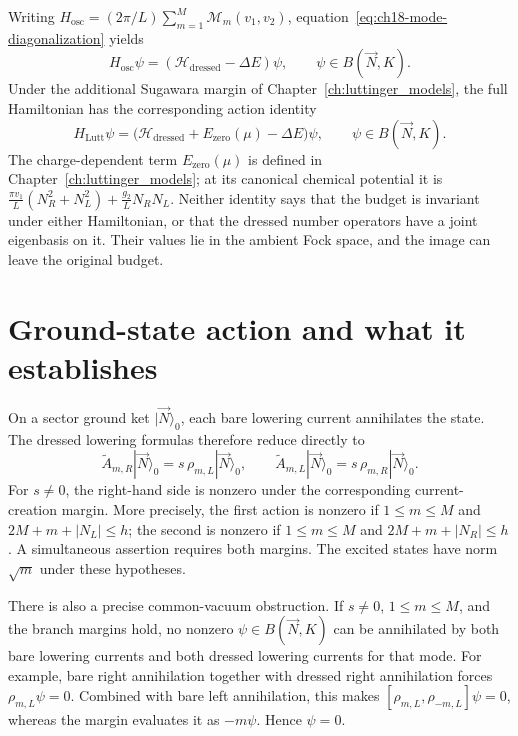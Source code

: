 Writing $H_{\mathrm{osc}}=(2\pi/L)\sum_{m=1}^M\mathcal M_m(v_1,v_2)$, equation~\eqref{eq:ch18-mode-diagonalization} yields
\begin{equation}
  H_{\mathrm{osc}}\psi=(\mathcal H_{\mathrm{dressed}}-\Delta E)\psi,
  \qquad \psi\in B(\vec N,K).
  \label{eq:ch18-oscillator-identity}
\end{equation}
\label{thm:oscillator_dressed_budget}
Under the additional Sugawara margin of Chapter~\ref{ch:luttinger_models}, the full Hamiltonian has the corresponding action identity
\begin{equation}
  H_{\mathrm{Lutt}}\psi=
  \bigl(\mathcal H_{\mathrm{dressed}}+E_{\mathrm{zero}}(\mu)-\Delta E\bigr)\psi,
  \qquad \psi\in B(\vec N,K).
  \label{eq:ch18-full-hamiltonian-identity}
\end{equation}
\label{thm:luttinger_hamiltonian_dressed_budget}
The charge-dependent term $E_{\mathrm{zero}}(\mu)$ is defined in Chapter~\ref{ch:luttinger_models}; at its canonical chemical potential it is $\frac{\pi v_1}{L}(N_R^2+N_L^2)+\frac{g_2}{L}N_RN_L$. Neither identity says that the budget is invariant under either Hamiltonian, or that the dressed number operators have a joint eigenbasis on it. Their values lie in the ambient Fock space, and the image can leave the original budget.

\section{Ground-state action and what it establishes}

On a sector ground ket $|\vec N\rangle_0$, each bare lowering current annihilates the state. The dressed lowering formulas therefore reduce directly to
\begin{equation}
  \widetilde A_{m,R}|\vec N\rangle_0
    =s\,\rho_{m,L}|\vec N\rangle_0,
  \qquad
  \widetilde A_{m,L}|\vec N\rangle_0
    =s\,\rho_{m,R}|\vec N\rangle_0.
  \label{eq:ch18-ground-action}
\end{equation}
\label{thm:ground_action}
For $s\ne0$, the right-hand side is nonzero under the corresponding current-creation margin. More precisely, the first action is nonzero if $1\leq m\leq M$ and $2M+m+|N_L|\leq h$; the second is nonzero if $1\leq m\leq M$ and $2M+m+|N_R|\leq h$. A simultaneous assertion requires both margins. The excited states have norm $\sqrt m$ under these hypotheses.

\label{thm:no_common_vacuum}
There is also a precise common-vacuum obstruction. If $s\ne0$, $1\leq m\leq M$, and the branch margins hold, no nonzero $\psi\in B(\vec N,K)$ can be annihilated by both bare lowering currents and both dressed lowering currents for that mode. For example, bare right annihilation together with dressed right annihilation forces $\rho_{m,L}\psi=0$. Combined with bare left annihilation, this makes $[\rho_{m,L},\rho_{-m,L}]\psi=0$, whereas the margin evaluates it as $-m\psi$. Hence $\psi=0$.


